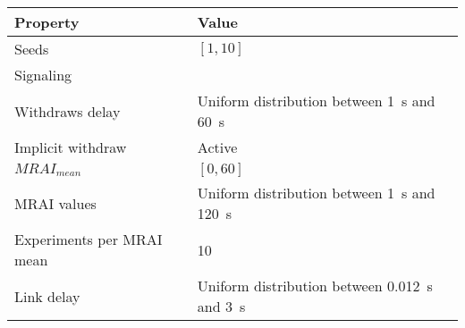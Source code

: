 \begin{center}
	\begin{tabular}{ || m{4.9cm}| m{7.3cm} || }
	\hline
	Property & Value \\
	\hline \hline
	Seeds & $[1, 10]$ \\
	\hline
	Signaling & \q{AW} \\
	\hline
		Withdraws delay & Uniform distribution between \SI{1}{\second} and \SI{60}{\second} \\
	\hline
		Implicit withdraw & Active \\
	\hline
			\(MRAI_{mean}\) & $[0, 60]$ \\
	\hline
		MRAI values & Uniform distribution between \SI{1}{\second} and \SI{120}{\second} \\
	\hline
		Experiments per \ac{MRAI} mean & \num{10} \\
	\hline
	Link delay & Uniform distribution between \SI{0.012}{\second} and \SI{3}{\second} \\
	\hline

	\end{tabular}
\end{center}
